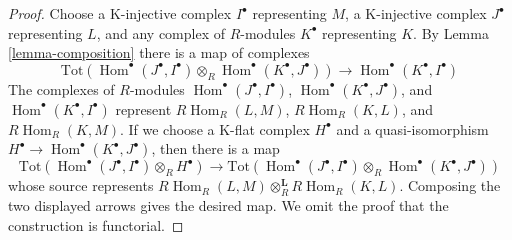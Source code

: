 \documentclass[10pt,a4paper]{amsart}
\theoremstyle{plain}
\theoremstyle{definition}
\theoremstyle{remark}
\numberwithin{equation}{subsection}
\def\Hom{\mathop{\mathrm{Hom}}\nolimits}
\begin{document}
\begin{proof}
Choose a K-injective complex $I^\bullet$ representing $M$,
a K-injective complex $J^\bullet$ representing $L$, and
any complex of $R$-modules $K^\bullet$ representing $K$.
By Lemma \ref{lemma-composition} there is a map of complexes
$$
\text{Tot}\left(
\Hom^\bullet(J^\bullet, I^\bullet) \otimes_R \Hom^\bullet(K^\bullet, J^\bullet)
\right)
\longrightarrow
\Hom^\bullet(K^\bullet, I^\bullet)
$$
The complexes of $R$-modules $\Hom^\bullet(J^\bullet, I^\bullet)$,
$\Hom^\bullet(K^\bullet, J^\bullet)$, and $\Hom^\bullet(K^\bullet, I^\bullet)$
represent $R\Hom_R(L, M)$, $R\Hom_R(K, L)$, and $R\Hom_R(K, M)$.
If we choose a K-flat complex $H^\bullet$ and a quasi-isomorphism
$H^\bullet \to \Hom^\bullet(K^\bullet, J^\bullet)$, then there is a map
$$
\text{Tot}\left(
\Hom^\bullet(J^\bullet, I^\bullet) \otimes_R H^\bullet
\right)
\longrightarrow
\text{Tot}\left(
\Hom^\bullet(J^\bullet, I^\bullet) \otimes_R \Hom^\bullet(K^\bullet, J^\bullet)
\right)
$$
whose source represents $R\Hom_R(L, M) \otimes_R^\mathbf{L} R\Hom_R(K, L)$.
Composing the two displayed arrows gives the desired map. We omit the
proof that the construction is functorial.
\end{proof}
\end{document}
